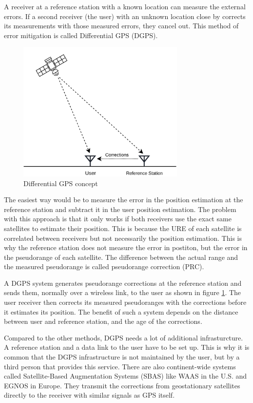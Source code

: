 A receiver at a reference station with a known location can measure the external errors.
If a second receiver (the user) with an unknown location close by corrects its measurements with those measured errors, they cancel out.
This method of error mitigation is called Differential GPS (DGPS).

\begin{figure}[ht]
 \centering
 \includegraphics[height=7cm]{images/Differential_GPS.png}
 \caption{Differential GPS concept}
 \label{fig:dgps}
\end{figure}

The easiest way would be to measure the error in the position estimation at the reference station and subtract it in the user position estimation.
The problem with this approach is that it only works if both receivers use the exact same satellites to estimate their position.
This is because the URE of each satellite is correlated between receivers but not necessarily the position estimation.
This is why the reference station does not measure the error in postiton, but the error in the pseudorange of each satellite.
The difference between the actual range and the measured pseudorange is called pseudorange correction (PRC).

A DGPS system generates pseudorange corrections at the reference station and sends them, normally over a wireless link, to the user as shown in figure \ref{fig:dgps}.
The user receiver then corrects its measured pseudoranges with the corrections before it estimates its position.
The benefit of such a system depends on the distance between user and reference station, and the age of the corrections.

Compared to the other methods, DGPS needs a lot of additional infrasturcture.
A reference station and a data link to the user have to be set up.
This is why it is common that the DGPS infrastructure is not maintained by the user, but by a third person that provides this service.
There are also continent-wide systems called Satellite-Based Augmentation Systems (SBAS) like WAAS in the U.S. and EGNOS in Europe.
They transmit the corrections from geostationary satellites directly to the receiver with similar signals as GPS itself.

